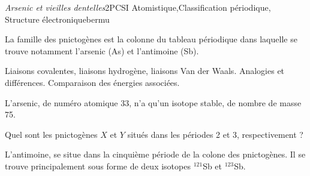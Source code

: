 
\begin{exercise}{\emph{Arsenic et vieilles dentelles}}{2}{PCSI}
{Atomistique,Classification périodique, Structure électronique}{bermu}

La famille des pnictogènes est la colonne du tableau périodique dans laquelle se trouve notamment l'arsenic (As) et l'antimoine (Sb).

\begin{questions}
    \questioncours Liaisons covalentes, liaisons hydrogène, liaisons Van der Waals. Analogies et différences. Comparaison des énergies associées.
    
    \question L'arsenic, de numéro atomique 33, n'a qu'un isotope stable, de nombre de masse 75.
    
    \question Quel sont les pnictogènes $X$ et $Y$ situés dans les périodes 2 et 3, respectivement ?
    
    \question L'antimoine, se situe dans la cinquième période de la colone des pnictogènes. Il se trouve principalement sous forme de deux isotopes $^{121}$Sb et $^{123}$Sb.


\end{questions}
\end{exercise}
